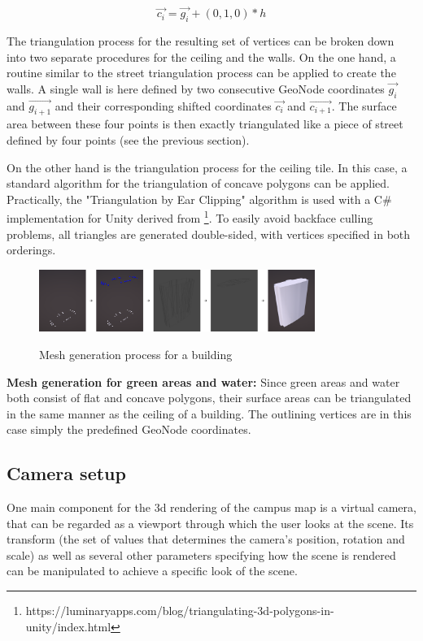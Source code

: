 \[\vec{c_{i}} = \vec{g_{i}} + (0, 1, 0) * h\]

The triangulation process for the resulting set of vertices can be broken down into two separate procedures for the ceiling and the walls. On the one hand, a routine similar to the street triangulation process can be applied to create the walls. A single wall is here defined by two consecutive GeoNode coordinates $\vec{g_{i}}$ and $\vec{g_{i + 1}}$ and their corresponding shifted coordinates $\vec{c_{i}}$ and $\vec{c_{i + 1}}$. The surface area between these four points is then exactly triangulated like a piece of street defined by four points (see the previous section).

On the other hand is the triangulation process for the ceiling tile. In this case, a standard algorithm for the triangulation of concave polygons can be applied. Practically, the "Triangulation by Ear Clipping" \cite{triangulation_by_ear_clipping} algorithm is used with a C\# implementation for Unity derived from \footnote{https://luminaryapps.com/blog/triangulating-3d-polygons-in-unity/index.html}. To easily avoid backface culling problems, all triangles are generated double-sided, with vertices specified in both orderings.

\begin{figure}[H]
	\centering
	\includegraphics[width=0.8\textwidth]{images/building_mesh_generation.png}\\
	\caption{Mesh generation process for a building}
\end{figure}

\textbf{Mesh generation for green areas and water:} Since green areas and water both consist of flat and concave polygons, their surface areas can be triangulated in the same manner as the ceiling of a building. The outlining vertices are in this case simply the predefined GeoNode coordinates.

\subsection{Camera setup}
One main component for the 3d rendering of the campus map is a virtual camera, that can be regarded as a viewport through which the user looks at the scene. Its transform (the set of values that determines the camera's position, rotation and scale) as well as several other parameters specifying how the scene is rendered can be manipulated to achieve a specific look of the scene.


